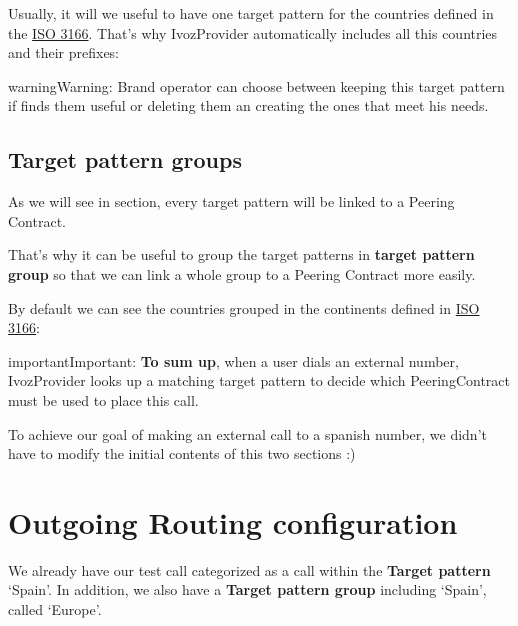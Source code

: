 \documentclass[letterpaper,10pt,english]{sphinxmanual}
\begin{document}
Usually, it will we useful to have one target pattern for the countries
defined in the \href{https://en.wikipedia.org/wiki/ISO\_3166}{ISO 3166}. That's why IvozProvider automatically
includes all this countries and their prefixes:


\begin{notice}{warning}{Warning:}
Brand operator can choose between keeping this target pattern if
finds them useful or deleting them an creating the ones that meet his needs.
\end{notice}


\subsection{Target pattern groups}
\label{brand/routing/target_pattern_groups::doc}\label{brand/routing/target_pattern_groups:target-pattern-groups}
As we will see in {\hyperref[brand/routing/index:outgoing\string-call\string-routing]{}} section, every target
pattern will be linked to a Peering Contract.

That's why it can be useful to group the target patterns in \textbf{target pattern group}
so that we can link a whole group to a Peering Contract more easily.

By default we can see the countries grouped in the continents defined in
\href{https://en.wikipedia.org/wiki/ISO\_3166}{ISO 3166}:


\begin{notice}{important}{Important:}
\textbf{To sum up}, when a user dials an external number, IvozProvider
looks up a matching target pattern to decide which PeeringContract must be used
to place this call.
\end{notice}

To achieve our goal of making an external call to a spanish number, we didn't have
to modify the initial contents of this two sections :)


\section{Outgoing Routing configuration}
\label{getting_started/external_outgoing_calls/call_routing:outgoing-routing-configuration}\label{getting_started/external_outgoing_calls/call_routing::doc}
We already have our test call categorized as a call within the \textbf{Target pattern}
`Spain'. In addition, we also have a \textbf{Target pattern group} including `Spain',
called `Europe'.
\end{document}
